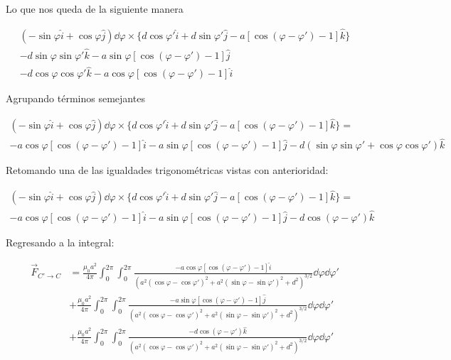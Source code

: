 \documentclass[11pt]{report}
\theoremstyle{plain}
\theoremstyle{definition}
\begin{document}
	Lo que nos queda de la siguiente manera
	
	\begin{align*}%
		\left(-\sin\varphi\hat{i} + \cos\varphi\hat{j}\right)\dd{\varphi} \times \{ d\cos\varphi'\hat{i}+d\sin\varphi'\hat{j}-a\left[\cos{(\varphi-\varphi')}-1\right]\hat{k} \}\\
		- d\sin\varphi\sin\varphi'\hat{k} - a\sin\varphi\left[\cos{(\varphi-\varphi')}-1\right]\hat{j}\\
		-d\cos\varphi\cos\varphi'\hat{k} - a\cos\varphi\left[\cos{(\varphi-\varphi')}-1\right]\hat{i}
	\end{align*}
	
	Agrupando términos semejantes
	
	\begin{align*}%
		\left(-\sin\varphi\hat{i} + \cos\varphi\hat{j}\right)\dd{\varphi} \times \{d\cos\varphi'\hat{i}+d\sin\varphi'\hat{j}-a\left[\cos{(\varphi-\varphi')}-1\right]\hat{k}\} = \\
		- a\cos\varphi\left[\cos{(\varphi-\varphi')}-1\right]\hat{i} - a\sin\varphi\left[\cos{(\varphi-\varphi')}-1\right]\hat{j}
		- d\left( \sin\varphi\sin\varphi'+\cos\varphi\cos\varphi'\right)\hat{k} 
	\end{align*}
	
	Retomando una de las igualdades trigonométricas vistas con anterioridad: 
	
	\begin{align*}%
		\left(-\sin\varphi\hat{i} + \cos\varphi\hat{j}\right)\dd{\varphi} \times \{d\cos\varphi'\hat{i}+d\sin\varphi'\hat{j}-a\left[\cos{(\varphi-\varphi')}-1\right]\hat{k}\} = \\
		- a\cos\varphi\left[\cos{(\varphi-\varphi')}-1\right]\hat{i} - a\sin\varphi\left[\cos{(\varphi-\varphi')}-1\right]\hat{j}
		- d\cos{(\varphi - \varphi')}\hat{k} 
	\end{align*}
	
	Regresando a la integral:
	
	\begin{align*}%
		\vec{F}_{C'\rightarrow C} &= \frac{\mu_0a^2}{4\pi}\int_0^{2\pi}\int_0^{2\pi}\frac{ - a\cos\varphi\left[\cos{(\varphi-\varphi')}-1\right]\hat{i} }{\left(a^2(\cos\varphi-\cos\varphi')^2 + a^2(\sin\varphi-\sin\varphi')^2 + d^2\right)^{3/2}}\dd{\varphi}\dd{\varphi'}\\
		&+ \frac{\mu_0a^2}{4\pi}\int_0^{2\pi}\int_0^{2\pi}\frac{ - a\sin\varphi\left[\cos{(\varphi-\varphi')}-1\right]\hat{j} }{\left(a^2(\cos\varphi-\cos\varphi')^2 + a^2(\sin\varphi-\sin\varphi')^2 + d^2\right)^{3/2}}\dd{\varphi}\dd{\varphi'}\\
		&+ \frac{\mu_0a^2}{4\pi}\int_0^{2\pi}\int_0^{2\pi}\frac{ - d\cos{(\varphi - \varphi')}\hat{k}  }{\left(a^2(\cos\varphi-\cos\varphi')^2 + a^2(\sin\varphi-\sin\varphi')^2 + d^2\right)^{3/2}}\dd{\varphi}\dd{\varphi'}
	\end{align*}
	
\end{document}
